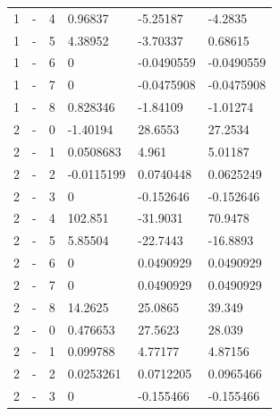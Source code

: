 \begin{longtable}
{}1 & \allowbreak{}-\allowbreak{} & 4 & 0.96837 & -5.25187 & -4.2835 \\
{}1 & \allowbreak{}-\allowbreak{} & 5 & 4.38952 & -3.70337 & 0.68615 \\
{}1 & \allowbreak{}-\allowbreak{} & 6 & 0 & -0.0490559 & -0.0490559 \\
{}1 & \allowbreak{}-\allowbreak{} & 7 & 0 & -0.0475908 & -0.0475908 \\
{}1 & \allowbreak{}-\allowbreak{} & 8 & 0.828346 & -1.84109 & -1.01274 \\
{}2 & \allowbreak{}-\allowbreak{} & 0 & -1.40194 & 28.6553 & 27.2534 \\
{}2 & \allowbreak{}-\allowbreak{} & 1 & 0.0508683 & 4.961 & 5.01187 \\
{}2 & \allowbreak{}-\allowbreak{} & 2 & -0.0115199 & 0.0740448 & 0.0625249 \\
{}2 & \allowbreak{}-\allowbreak{} & 3 & 0 & -0.152646 & -0.152646 \\
{}2 & \allowbreak{}-\allowbreak{} & 4 & 102.851 & -31.9031 & 70.9478 \\
{}2 & \allowbreak{}-\allowbreak{} & 5 & 5.85504 & -22.7443 & -16.8893 \\
{}2 & \allowbreak{}-\allowbreak{} & 6 & 0 & 0.0490929 & 0.0490929 \\
{}2 & \allowbreak{}-\allowbreak{} & 7 & 0 & 0.0490929 & 0.0490929 \\
{}2 & \allowbreak{}-\allowbreak{} & 8 & 14.2625 & 25.0865 & 39.349 \\
{}2 & \allowbreak{}-\allowbreak{} & 0 & 0.476653 & 27.5623 & 28.039 \\
{}2 & \allowbreak{}-\allowbreak{} & 1 & 0.099788 & 4.77177 & 4.87156 \\
{}2 & \allowbreak{}-\allowbreak{} & 2 & 0.0253261 & 0.0712205 & 0.0965466 \\
{}2 & \allowbreak{}-\allowbreak{} & 3 & 0 & -0.155466 & -0.155466 \\

\end{longtable}
